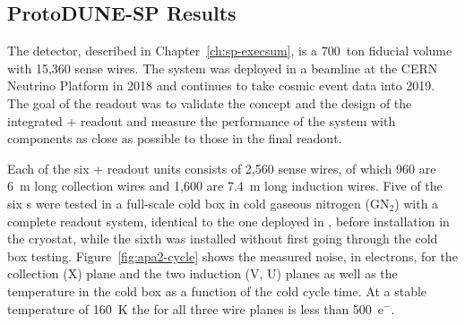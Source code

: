 \subsection{ProtoDUNE-SP Results}
\label{sec:fdsp-tpcelec-overview-pdune}

The %
detector, described 
in Chapter~\ref{ch:sp-execsum}, is a 700~ton fiducial volume 
 with 15,360 sense wires. 
The system was deployed in a beamline at the CERN Neutrino Platform 
in 2018 and continues to take cosmic event data into 2019. The goal of 
the   readout was to validate the concept 
and the design of the integrated + readout 
and measure the performance of the  system with components 
as close as possible to those in the final   readout.

Each of the six  +
readout units consists of 2,560 sense wires, of which 960 are \SI{6}{m} 
long collection wires and 1,600 are \SI{7.4}{m} long induction wires. 
Five of the six s were tested in a full-scale cold box in 
cold gaseous nitrogen (GN$_2$) with a complete  readout system,  
identical to the one %
deployed in , before installation in the cryostat,
while the sixth %
 was installed without first going through the cold
box testing. Figure~\ref{fig:apa2-cycle} shows the measured noise, in 
electrons, for the collection (X) plane and the two induction (V, U) 
planes as well as the  temperature in the cold box as a 
function of the cold cycle time. At a stable temperature of 
\SI{160}{K} the  for all three wire planes is less than 500~e$^-$.


